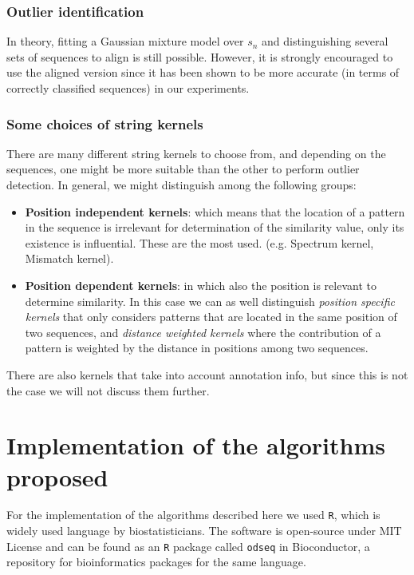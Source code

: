 \documentclass[a4paper]{llncs}
\begin{document}
\subsubsection{Outlier identification}

In theory, fitting a Gaussian mixture model over $s_n$ and distinguishing several sets of sequences to align is still possible. However, it is strongly encouraged to use the aligned version since it has been shown to be more accurate (in terms of correctly classified sequences) in our experiments.

\subsubsection{Some choices of string kernels} There are many different string kernels to choose from, and depending on the sequences, one might be more suitable than the other to perform outlier detection. In general, we might distinguish among the following groups:

\begin{itemize}
\item \textbf{Position independent kernels}: which means that the location of a pattern in the sequence is irrelevant for determination of the similarity value, only its existence is influential. These are the most used. (e.g. Spectrum kernel, Mismatch kernel).
\item \textbf{Position dependent kernels}: in which also the position is relevant to determine similarity. In this case we can as well distinguish \textit{position specific kernels} that only considers patterns that are located in the same position of two sequences, and \textit{distance weighted kernels} where the contribution of a pattern is weighted by the distance in positions among two sequences.
\end{itemize}

There are also kernels that take into account annotation info, but since this is not the case we will not discuss them further.

\section{Implementation of the algorithms proposed}

For the implementation of the algorithms described here we used \texttt{R}, which is widely used language by biostatisticians. The software is open-source under MIT License and can be found as an \texttt{R} package called \texttt{odseq} in Bioconductor, a repository for bioinformatics packages for the same language.\\
\end{document}

